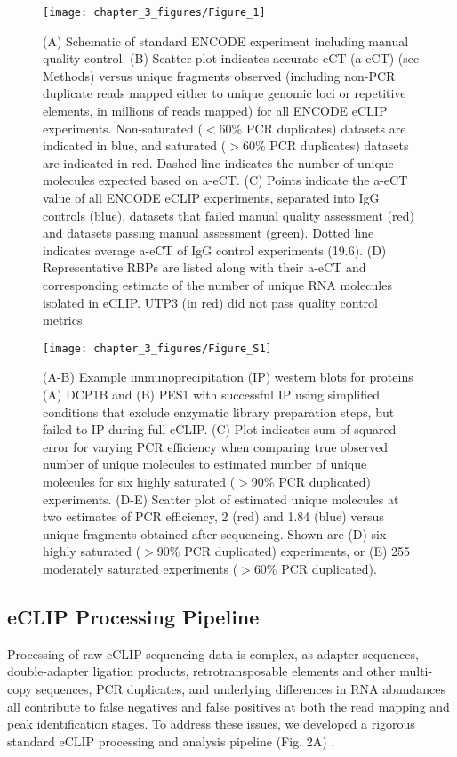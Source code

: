 \begin{figure}[ht]
  \centering
  \texttt{[image: chapter\_3\_figures/Figure\_1]}
  \caption[Figure 1. Estimation of unique RNA fragments recovered by a-eCT]{(A) Schematic of standard ENCODE experiment including manual quality control. (B) Scatter plot indicates accurate-eCT (a-eCT) (see Methods) versus unique fragments observed (including non-PCR duplicate reads mapped either to unique genomic loci or repetitive elements, in millions of reads mapped) for all ENCODE eCLIP experiments. Non-saturated ($<$60\% PCR duplicates) datasets are indicated in blue, and saturated ($>$60\% PCR duplicates) datasets are indicated in red. Dashed line indicates the number of unique molecules expected based on a-eCT. (C) Points indicate the a-eCT value of all ENCODE eCLIP experiments, separated into IgG controls (blue), datasets that failed manual quality assessment (red) and datasets passing manual assessment (green). Dotted line indicates average a-eCT of IgG control experiments (19.6). (D) Representative RBPs are listed along with their a-eCT and corresponding estimate of the number of unique RNA molecules isolated in eCLIP. UTP3 (in red) did not pass quality control metrics.}
  \label{fig:Figure_1}
  \end{figure}

\begin{figure}[ht]
  \centering
  \texttt{[image: chapter\_3\_figures/Figure\_S1]}
  \caption[Supplementary Figure 1. Estimation of unique RNA fragments recovered by a-eCT]{(A-B) Example immunoprecipitation (IP) western blots for proteins (A) DCP1B and (B) PES1 with successful IP using simplified conditions that exclude enzymatic library preparation steps, but failed to IP during full eCLIP. (C) Plot indicates sum of squared error for varying PCR efficiency when comparing true observed number of unique molecules to estimated number of unique molecules for six highly saturated ($>$90\% PCR duplicated) experiments. (D-E) Scatter plot of estimated unique molecules at two estimates of PCR efficiency, 2 (red) and 1.84 (blue) versus unique fragments obtained after sequencing. Shown are (D) six highly saturated ($>$90\% PCR duplicated) experiments, or (E) 255 moderately saturated experiments ($>$60\% PCR duplicated).}
  \label{fig:Figure_S1}
\end{figure}

\subsection{eCLIP Processing Pipeline}
Processing of raw eCLIP sequencing data is complex, as adapter sequences, double-adapter ligation products, retrotransposable elements and other multi-copy sequences, PCR duplicates, and underlying differences in RNA abundances all contribute to false negatives and false positives at both the read mapping and peak identification stages. To address these issues, we developed a rigorous standard eCLIP processing and analysis pipeline (Fig. 2A) \cite{VanNostrand2016}.

